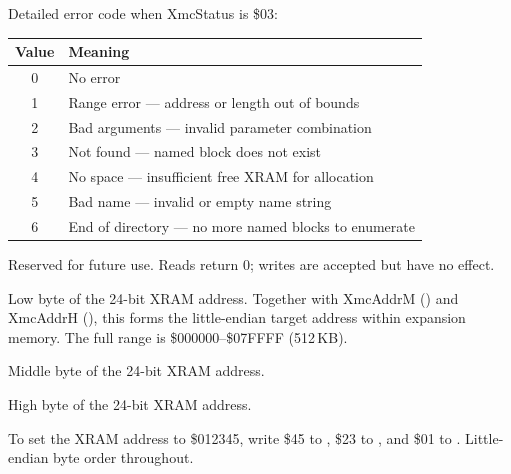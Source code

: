 

Detailed error code when XmcStatus is \$03:

\begin{center}
\small
\begin{tabular}{@{}cl@{}}
\toprule
\textbf{Value} & \textbf{Meaning} \\
\midrule
0 & No error \\
1 & Range error --- address or length out of bounds \\
2 & Bad arguments --- invalid parameter combination \\
3 & Not found --- named block does not exist \\
4 & No space --- insufficient free XRAM for allocation \\
5 & Bad name --- invalid or empty name string \\
6 & End of directory --- no more named blocks to enumerate \\
\bottomrule
\end{tabular}
\end{center}



Reserved for future use.  Reads return 0; writes are accepted but have no
effect.



Low byte of the 24-bit XRAM address.  Together with XmcAddrM ()
and XmcAddrH (), this forms the little-endian target address
within expansion memory.  The full range is \$000000--\$07FFFF (512\,KB).


Middle byte of the 24-bit XRAM address.


High byte of the 24-bit XRAM address.

\begin{tipbox}
To set the XRAM address to \$012345, write \$45 to , \$23 to
, and \$01 to .  Little-endian byte order throughout.
\end{tipbox}

